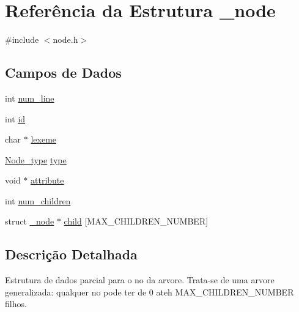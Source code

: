 \hypertarget{struct__node}{
\section{Referência da Estrutura \_\-node}
\label{struct__node}
}


{\ttfamily \#include $<$node.h$>$}\subsection*{Campos de Dados}
\begin{DoxyCompactItemize}
\item 
int \hyperlink{struct__node_ad9586487581d158778b8ec89f2fb321d}{num\_\-line}
\item 
int \hyperlink{struct__node_ab39ddc82d829722815b9bbd71ce4bd8d}{id}
\item 
char $\ast$ \hyperlink{struct__node_ad88ded3f26dc3e6469372e4740cefba7}{lexeme}
\item 
\hyperlink{node_8h_af78666e6cb576ec864360f78107a356a}{Node\_\-type} \hyperlink{struct__node_a7d8402191946be24896b7517484c2d0b}{type}
\item 
void $\ast$ \hyperlink{struct__node_a8635514c1a76f9660692563ea9bb8ef1}{attribute}
\item 
int \hyperlink{struct__node_a5f1c09c3697d9a06e1e530441aac18bc}{num\_\-children}
\item 
struct \hyperlink{struct__node}{\_\-node} $\ast$ \hyperlink{struct__node_aa1e3d575ec8721f5c4924c8b83163acc}{child} \mbox{[}MAX\_\-CHILDREN\_\-NUMBER\mbox{]}
\end{DoxyCompactItemize}


\subsection{Descrição Detalhada}
Estrutura de dados parcial para o no da arvore. Trata-\/se de uma arvore generalizada: qualquer no pode ter de 0 ateh MAX\_\-CHILDREN\_\-NUMBER filhos. 

